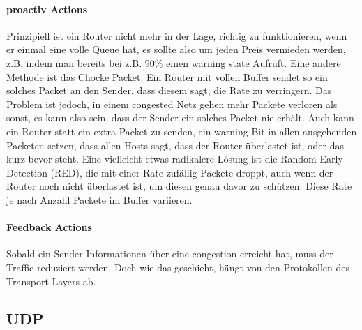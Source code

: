 			\paragraph{proactiv Actions}
				Prinzipiell ist ein Router nicht mehr in der Lage, richtig zu funktionieren, wenn er einmal eine volle Queue hat, es sollte also um jeden Preis vermieden werden, z.B. indem man bereits bei z.B. 90\% einen warning state Aufruft. Eine andere Methode ist das Chocke Packet. Ein Router mit vollen Buffer sendet so ein solches Packet an den Sender, dass diesem sagt, die Rate zu verringern. Das Problem ist jedoch, in einem congested Netz gehen mehr Packete verloren als sonst, es kann also sein, dass der Sender ein solches Packet nie erhält. Auch kann ein Router statt ein extra Packet zu senden, ein warning Bit in allen ausgehenden Packeten setzen, dass allen Hosts sagt, dass der Router überlastet ist, oder das kurz bevor steht. Eine vielleicht etwas radikalere Lösung ist die Random Early Detection (RED), die mit einer Rate zufällig Packete droppt, auch wenn der Router noch nicht überlastet ist, um diesen genau davor zu schützen. Diese Rate je nach Anzahl Packete im Buffer variieren. 

			\paragraph{Feedback Actions}
				Sobald ein Sender Informationen über eine congestion erreicht hat, muss der Traffic reduziert werden. Doch wie das geschieht, hängt von den Protokollen des Transport Layers ab.

	\subsection{UDP}
